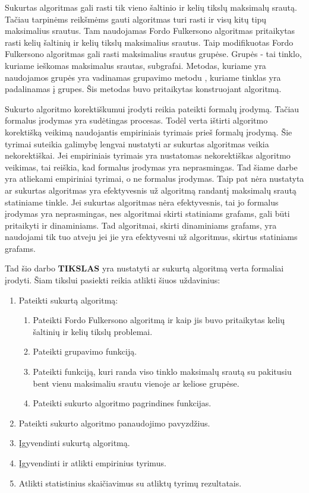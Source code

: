 Sukurtas algoritmas gali rasti  tik vieno šaltinio ir kelių tikslų maksimalų srautą. Tačiau tarpinėms reikšmėms gauti algoritmas turi rasti ir visų kitų tipų maksimalius srautus. Tam naudojamas Fordo Fulkersono algoritmas  \cite{FiN} pritaikytas rasti kelių šaltinių ir kelių tikslų maksimalius srautus. Taip modifikuotas Fordo Fulkersono algoritmas gali rasti maksimalius srautus grupėse. Grupės - tai tinklo, kuriame ieškomas maksimalus srautas, subgrafai. Metodas, kuriame yra naudojamos grupės yra vadinamas grupavimo metodu \cite{DSfUoMST}, kuriame tinklas yra padalinamas į grupes. Šis metodas buvo pritaikytas konstruojant algoritmą.

Sukurto algoritmo korektiškumui įrodyti reikia pateikti formalų įrodymą. Tačiau formalus įrodymas yra sudėtingas procesas. Todėl verta ištirti algoritmo korektišką veikimą naudojantis empiriniais tyrimais prieš formalų įrodymą. Šie tyrimai suteikia galimybę lengvai nustatyti ar sukurtas algoritmas veikia nekorektiškai. Jei empiriniais tyrimais yra nustatomas nekorektiškas algoritmo veikimas, tai reiškia, kad formalus įrodymas yra neprasmingas. Tad šiame darbe yra atliekami empiriniai tyrimai, o ne formalus įrodymas. Taip pat nėra nustatyta ar sukurtas algoritmas yra efektyvesnis už algoritmą randantį maksimalų srautą statiniame tinkle. Jei sukurtas algoritmas nėra efektyvesnis, tai jo formalus įrodymas yra neprasmingas, nes algoritmai skirti statiniams grafams, gali būti pritaikyti ir dinaminiams. Tad algoritmai, skirti dinaminiams grafams, yra naudojami tik tuo atveju jei jie yra efektyvesni už algoritmus, skirtus statiniams grafams.

Tad šio darbo \textbf{TIKSLAS} yra nustatyti ar sukurtą algoritmą verta formaliai įrodyti. Šiam tikslui pasiekti reikia atlikti šiuos uždavinius:
\begin{enumerate}
	\item Pateikti sukurtą algoritmą:	
	\begin{enumerate}
		\item  Pateikti Fordo Fulkersono algoritmą ir kaip jis buvo pritaikytas kelių šaltinių ir kelių tikslų problemai.
		\item Pateikti grupavimo funkciją.
		\item Pateikti funkciją, kuri randa viso tinklo maksimalų srautą su pakitusiu bent vienu maksimaliu srautu vienoje ar keliose grupėse.
		\item Pateikti sukurto algoritmo pagrindines funkcijas.
	\end{enumerate}
	\item Pateikti sukurto algoritmo panaudojimo pavyzdžius.
	\item Įgyvendinti sukurtą algoritmą.
	\item Įgyvendinti ir atlikti empirinius tyrimus.
	\item Atlikti statistinius skaičiavimus su atliktų tyrimų rezultatais.
\end{enumerate}

